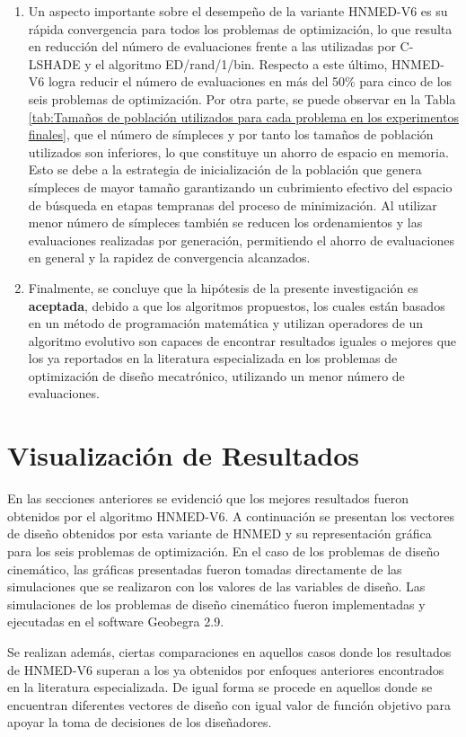 \begin{enumerate}
  \item Un aspecto importante sobre el desempeño de la variante HNMED-V6 es su rápida convergencia para todos los problemas de optimización, lo que resulta en reducción del número de evaluaciones frente a las utilizadas por C-LSHADE y el algoritmo ED/rand/1/bin. Respecto a este último, HNMED-V6 logra reducir el número de evaluaciones en más del 50\% para cinco de los seis problemas de optimización. Por otra parte, se puede observar en la Tabla \ref{tab:Tamaños de población utilizados para cada problema en los experimentos finales}, que el número de símpleces y por tanto los tamaños de población utilizados son inferiores, lo que constituye un ahorro de espacio en memoria. Esto se debe a la estrategia de inicialización de la población que genera símpleces de mayor tamaño  garantizando un cubrimiento efectivo del espacio de búsqueda en etapas tempranas del proceso de minimización. Al utilizar menor número de símpleces también se reducen los ordenamientos y las evaluaciones realizadas por generación, permitiendo el ahorro de evaluaciones en general y la rapidez de convergencia alcanzados.

\item Finalmente, se concluye que la hipótesis de la presente investigación es \textbf{aceptada}, debido a que los algoritmos propuestos, los cuales están basados en un método de programación matemática y utilizan operadores de un algoritmo evolutivo son capaces de encontrar resultados iguales o mejores que los ya reportados en la literatura especializada en los problemas de optimización de diseño mecatrónico, utilizando un menor número de evaluaciones.
\end{enumerate}

\section{Visualización de Resultados}
En las secciones anteriores se evidenció que los mejores resultados fueron obtenidos por el algoritmo HNMED-V6. A continuación se presentan los vectores de diseño obtenidos por esta variante de HNMED y su representación gráfica para los seis problemas de optimización. En el caso de los problemas de diseño cinemático, las gráficas presentadas fueron tomadas directamente de las simulaciones que se realizaron con los valores de las variables de diseño.  Las simulaciones de los problemas de diseño cinemático fueron implementadas y ejecutadas en el software Geobegra 2.9. 

Se realizan además, ciertas comparaciones en aquellos casos donde los resultados de HNMED-V6 superan a los ya obtenidos por enfoques anteriores encontrados en la literatura especializada. De igual forma se procede en aquellos donde se encuentran diferentes vectores de diseño con igual valor de función objetivo para apoyar la toma de decisiones de los diseñadores.
